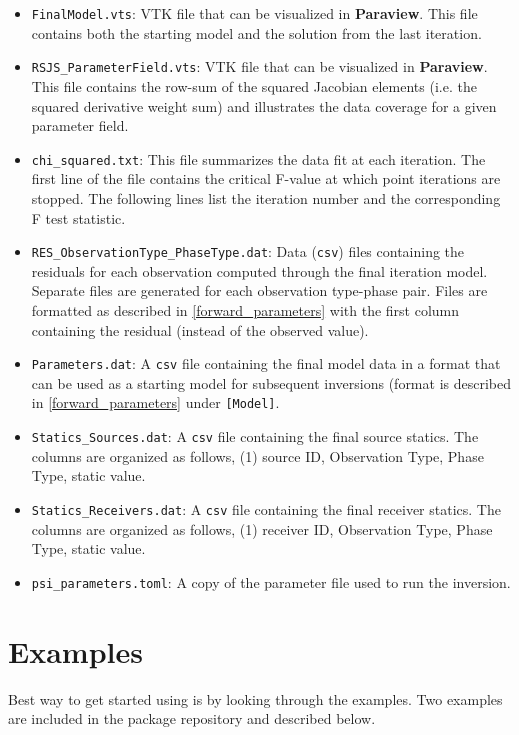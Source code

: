 \begin{itemize}
\item \texttt{FinalModel.vts}: VTK file that can be visualized in \textbf{Paraview}. This file contains both the starting model and the solution from the last iteration.
\item \texttt{RSJS\_ParameterField.vts}: VTK file that can be visualized in \textbf{Paraview}. This file contains the row-sum of the squared Jacobian elements (i.e. the squared derivative weight sum) and illustrates the data coverage for a given parameter field.
\item \texttt{chi\_squared.txt}: This file summarizes the data fit at each iteration. The first line of the file contains the critical F-value at which point iterations are stopped. The following lines list the iteration number and the corresponding F test statistic.
\item \texttt{RES\_ObservationType\_PhaseType.dat}: Data (\texttt{csv}) files containing the  residuals for each observation computed through the final iteration model. Separate files are generated for each observation type-phase pair. Files are formatted as described in \ref{forward_parameters} with the first column containing the residual (instead of the observed value).
\item \texttt{Parameters.dat}: A \texttt{csv} file containing the final model data in a format that can be used as a starting model for subsequent inversions (format is described in \ref{forward_parameters} under \texttt{[Model]}.
\item \texttt{Statics\_Sources.dat}: A \texttt{csv} file containing the final source statics. The columns are organized as follows, (1) source ID, Observation Type, Phase Type, static value.
\item \texttt{Statics\_Receivers.dat}: A \texttt{csv} file containing the final receiver statics. The columns are organized as follows, (1) receiver ID, Observation Type, Phase Type, static value.
\item \texttt{psi\_parameters.toml}: A copy of the parameter file used to run the inversion.
\end{itemize}


\section{Examples} \label{PSI_D:Examples}
Best way to get started using \psitomotitle{} is by looking through the examples. Two examples are included in the package repository and described below.

